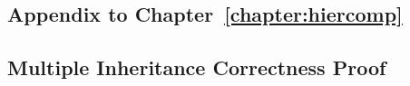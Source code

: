 \documentclass[inscr,ack,preface]{diphdthesis}
\begin{document}

\begin{appendix}
\appendixstartedtrue

{}

\chapter{Appendix to Chapter~\ref{chapter:hiercomp}}
\section{Multiple Inheritance Correctness Proof}


\end{appendix}



\cleardoublepage
{}
{}
\printbibliography[title={References}]
\end{document}
